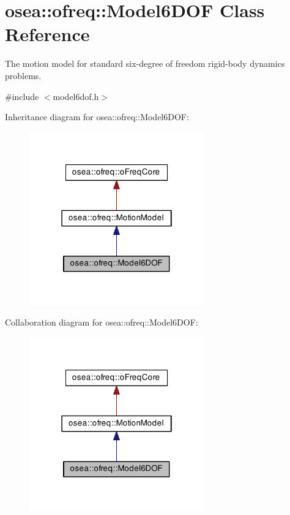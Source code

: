 \hypertarget{classosea_1_1ofreq_1_1_model6_d_o_f}{\section{osea\-:\-:ofreq\-:\-:Model6\-D\-O\-F Class Reference}
\label{classosea_1_1ofreq_1_1_model6_d_o_f}
}


The motion model for standard six-\/degree of freedom rigid-\/body dynamics problems.  




{\ttfamily \#include $<$model6dof.\-h$>$}



Inheritance diagram for osea\-:\-:ofreq\-:\-:Model6\-D\-O\-F\-:
\nopagebreak
\begin{figure}[H]
\begin{center}
\leavevmode
\includegraphics[width=214pt]{classosea_1_1ofreq_1_1_model6_d_o_f__inherit__graph}
\end{center}
\end{figure}


Collaboration diagram for osea\-:\-:ofreq\-:\-:Model6\-D\-O\-F\-:
\nopagebreak
\begin{figure}[H]
\begin{center}
\leavevmode
\includegraphics[width=214pt]{classosea_1_1ofreq_1_1_model6_d_o_f__coll__graph}
\end{center}
\end{figure}
